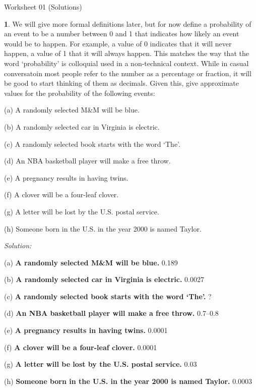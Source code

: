 \documentclass{tufte-handout}
\providecommand{\tightlist}{%
  \setlength{\itemsep}{0pt}\setlength{\parskip}{0pt}}
\begin{document}
\justify

{\LARGE Worksheet 01 (Solutions)}

\vspace*{18pt}


\textbf{1}. We will give more formal definitions later, but for now
define a probability of an event to be a number between 0 and 1 that
indicates how likely an event would be to happen. For example, a
value of 0 indicates that it will never happen, a value of 1 that it
will always happen. This matches the way that the word `probability' is
colloquial used in a non-technical context. While in casual conversatoin
most people refer to the number as a percentage or fraction, it will
be good to start thinking of them as decimals. Given this, give approximate
values for the probability of the following events:

\begin{itemize}[\label={}]
  \tightlist
  \item {(a)} A randomly selected M\&M will be blue.
  \item {(b)} A randomly selected car in Virginia is electric.
  \item {(c)} A randomly selected book starts with the word `The'.
  \item {(d)} An NBA basketball player will make a free throw.
  \item {(e)} A pregnancy results in having twins.
  \item {(f)} A clover will be a four-leaf clover.
  \item {(g)} A letter will be lost by the U.S. postal service.
  \item {(h)} Someone born in the U.S. in the year 2000 is named Taylor.
\end{itemize}

\textit{Solution:} 

\begin{itemize}[\label={}]
  \tightlist
  \item {(a)} \textbf{A randomly selected M\&M will be blue.} 0.189
  \item {(b)} \textbf{A randomly selected car in Virginia is electric.} 0.0027
  \item {(c)} \textbf{A randomly selected book starts with the word `The'.} ?
  \item {(d)} \textbf{An NBA basketball player will make a free throw.} 0.7--0.8
  \item {(e)} \textbf{A pregnancy results in having twins.} 0.0001
  \item {(f)} \textbf{A clover will be a four-leaf clover.} 0.0001
  \item {(g)} \textbf{A letter will be lost by the U.S. postal service.} 0.03
  \item {(h)} \textbf{Someone born in the U.S. in the year 2000 is named Taylor.} 0.0003
\end{itemize}
\end{document}
